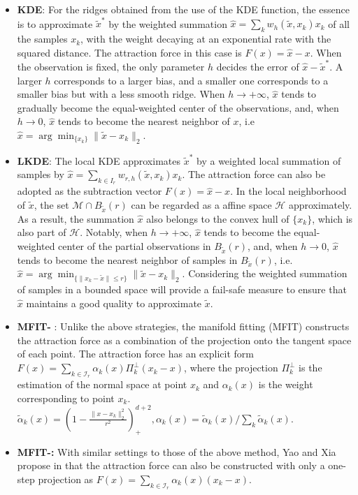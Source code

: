 \documentclass[aos,preprint]{imsart}
\theoremstyle{remark}
\begin{document}
\begin{itemize}
\item{\bf KDE}: For the ridges obtained from the use of the KDE function, the essence is to approximate $\tilde{x}^*$ by the weighted summation  $\hat{x} = \sum_k w_h(\tilde{x}, x_k)x_k$ of all the samples $x_k$, with the weight decaying at an exponential rate with the squared distance. The attraction force in this case is $F(x) = \hat{x}-x$. When the observation is fixed, the only parameter $h$ decides the error of $\hat{x}-\tilde{x}^*$. A larger $h$ corresponds to a larger bias, and a smaller one corresponds to a smaller bias but with a less smooth ridge. When $h\rightarrow +\infty$, $\hat{x}$ tends to gradually become the equal-weighted center of the observations, and, when $h\rightarrow 0$, $\hat{x}$ tends to become the nearest neighbor of $x$, i.e $\hat{x} = \arg\min_{\{x_k\}} \|\tilde{x}-x_k\|_2$.

\item{\bf LKDE}:  The local KDE approximates $\tilde{x}^*$ by a weighted local summation of samples by $\hat{x} = \sum_{k\in I_r} w_{r,h} (\tilde{x}, x_k)x_k$. The attraction force can also be adopted as the subtraction vector $F(x) = \hat{x}-x$. In the local neighborhood of $\tilde{x}$, the set ${\mathcal M} \cap  B_{\tilde{x}}(r)$ can be regarded as a affine space $\mathcal H$ approximately. As a result, the summation $\hat{x}$ also belongs to the convex hull of $\{x_k\}$, which is also part of $\mathcal H$. Notably, when $h\rightarrow +\infty$, $\hat{x}$ tends to become the equal-weighted center of the partial observations in $B_{\tilde{x}}(r)$, and, when $h\rightarrow 0$, $\hat{x}$ tends to become the nearest neighbor of samples in $B_{\tilde{x}}(r)$, i.e. $\hat{x} = \arg\min_{\{\|x_k-\tilde{x}\|\leq r\}} \|\tilde{x}-x_k\|_2$. Considering the weighted summation of samples in a bounded space will provide a fail-safe measure to ensure that $\hat{x}$ maintains a good quality to approximate $\tilde{x}$.
\item{\bf MFIT-} :  Unlike the above strategies, the manifold fitting (MFIT) constructs the attraction force as a combination of the projection onto the tangent space of each point. The attraction force has an explicit form $F(x)= \sum_{k\in{\mathcal I}_r}\alpha_k(x) \Pi_k^\perp (x_k - x)$, where the projection $\Pi_k^\perp$ is the estimation of the normal space at point $x_k$ and $\alpha_k(x)$ is the weight corresponding to point $x_k$.
 $\tilde{\alpha}_k(x) = (1-\frac{\|x-x_k\|_2^2}{r^2})^{d+2}_+, \alpha_k(x) = \tilde{\alpha}_k(x)/ \sum_k \tilde{\alpha}_k(x)$.
\item{\bf MFIT-:} With similar settings to those of the above method, Yao and Xia propose in \cite{yao2019manifold} that the attraction force can also be constructed with only a one-step projection as $F(x)= \sum_{k\in{\mathcal I}_r}\alpha_k(x)  (x_k - x)$.
\end{itemize}
\end{document}
